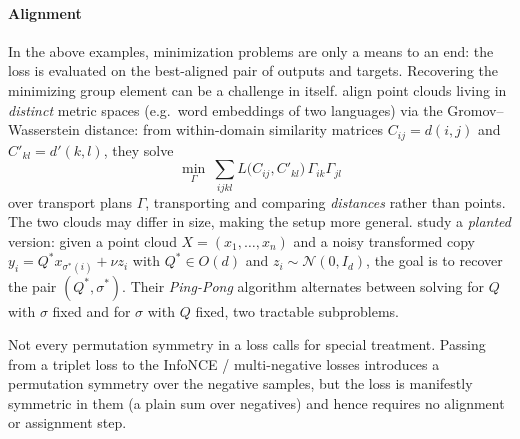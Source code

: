 \documentclass[mathematics,review,submit,moreauthors]{Definitions/mdpi}
\begin{document}
\paragraph{Alignment}\label{sec:framework-criterion-alignment}
In the above examples, minimization problems are only a means to an end: the loss is evaluated on the best-aligned pair of outputs and targets.
Recovering the minimizing group element can be a challenge in itself.
\citet{alvarez-melis2018p2cemnlp} align point clouds living in \emph{distinct} metric spaces (e.g.\ word embeddings of two languages) via the Gromov--Wasserstein distance: from within-domain similarity matrices $C_{ij}=d(i,j)$ and $C'_{kl}=d'(k,l)$, they solve
$$
\min_{\Gamma}\ \sum_{ijkl} L\big(C_{ij}, C'_{kl}\big)\,\Gamma_{ik}\Gamma_{jl}
$$
over transport plans $\Gamma$, transporting and comparing \emph{distances} rather than points.
The two clouds may differ in size, making the setup more general.
\citet{even2024} study a \emph{planted} version: given a point cloud $X=(x_1,\dots,x_n)$ and a noisy transformed copy $y_i=Q^* x_{\sigma^*(i)}+\nu z_i$ with $Q^*\in O(d)$ and $z_i\sim\mathcal{N}(0,I_d)$, the goal is to recover the pair $(Q^*,\sigma^*)$.
Their \emph{Ping-Pong} algorithm alternates between solving for $Q$ with $\sigma$ fixed and for $\sigma$ with $Q$ fixed, two tractable subproblems.

\begin{Remark}
Not every permutation symmetry in a loss calls for special treatment.
Passing from a triplet loss to the InfoNCE / multi-negative losses \citep{oord2018a} introduces a permutation symmetry over the negative samples, but the loss is manifestly symmetric in them (a plain sum over negatives) and hence requires no alignment or assignment step.
\end{Remark}
\end{document}
